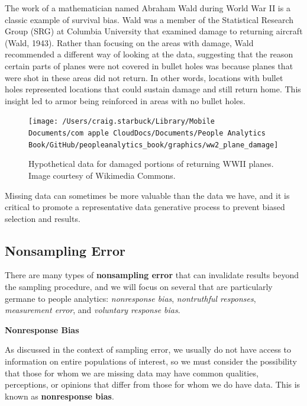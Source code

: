 \documentclass[
]{book}
\begin{document}
The work of a mathematician named Abraham Wald during World War II is a classic example of survival bias. Wald was a member of the Statistical Research Group (SRG) at Columbia University that examined damage to returning aircraft (Wald, 1943). Rather than focusing on the areas with damage, Wald recommended a different way of looking at the data, suggesting that the reason certain parts of planes were not covered in bullet holes was because planes that were shot in these areas did not return. In other words, locations with bullet holes represented locations that could sustain damage and still return home. This insight led to armor being reinforced in areas with no bullet holes.

\begin{figure}

{\centering \texttt{[image: /Users/craig.starbuck/Library/Mobile Documents/com~apple~CloudDocs/Documents/People Analytics Book/GitHub/peopleanalytics\_book/graphics/ww2\_plane\_damage]} 

}

\caption{Hypothetical data for damaged portions of returning WWII planes. Image courtesy of Wikimedia Commons.}\label{fig:ww2-plane-damage}
\end{figure}

Missing data can sometimes be more valuable than the data we have, and it is critical to promote a representative data generative process to prevent biased selection and results.

\hypertarget{nonsampling-error}{%
\subsection{Nonsampling Error}\label{nonsampling-error}}

There are many types of \textbf{nonsampling error} that can invalidate results beyond the sampling procedure, and we will focus on several that are particularly germane to people analytics: \emph{nonresponse bias}, \emph{nontruthful responses}, \emph{measurement error}, and \emph{voluntary response bias}.

\textbf{Nonresponse Bias}

As discussed in the context of sampling error, we usually do not have access to information on entire populations of interest, so we must consider the possibility that those for whom we are missing data may have common qualities, perceptions, or opinions that differ from those for whom we do have data. This is known as \textbf{nonresponse bias}.
\end{document}
